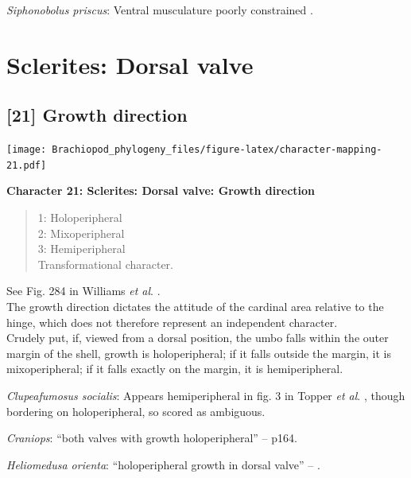 \documentclass[openany]{book}
\theoremstyle{definition}
\theoremstyle{definition}
\theoremstyle{definition}
\theoremstyle{remark}
\begin{document}
\hypertarget{Siphonobolus_priscus-coding-20}{}
\emph{Siphonobolus priscus}: Ventral musculature poorly constrained
\citep{Williams2000LinguliformeaCraniiformea, Popov2009Earlyontogeny}.

\section{Sclerites: Dorsal valve}\label{sclerites-dorsal-valve}

\subsection*{{[}21{]} Growth direction}\label{growth-direction}

\texttt{[image: Brachiopod\_phylogeny\_files/figure-latex/character-mapping-21.pdf]}

\textbf{Character 21: Sclerites: Dorsal valve: Growth direction}

\begin{quote}
1: Holoperipheral\\
2: Mixoperipheral\\
3: Hemiperipheral\\
Transformational character.
\end{quote}

See Fig. 284 in Williams \emph{et al}.
\citeyearpar{Williams1997Introduction}.\\
The growth direction dictates the attitude of the cardinal area relative
to the hinge, which does not therefore represent an independent
character.\\
Crudely put, if, viewed from a dorsal position, the umbo falls within
the outer margin of the shell, growth is holoperipheral; if it falls
outside the margin, it is mixoperipheral; if it falls exactly on the
margin, it is hemiperipheral.

\hypertarget{Clupeafumosus_socialis-coding-21}{}
\emph{Clupeafumosus socialis}: Appears hemiperipheral in fig. 3 in
Topper \emph{et al}. \citeyearpar{Topper2013Reappraisalof}, though
bordering on holoperipheral, so scored as ambiguous.

\hypertarget{Craniops-coding-21}{}
\emph{Craniops}: ``both valves with growth holoperipheral'' --
\citet{Williams2000LinguliformeaCraniiformea} p164.

\hypertarget{Heliomedusa_orienta-coding-21}{}
\emph{Heliomedusa orienta}: ``holoperipheral growth in dorsal valve'' --
\citet{Williams2007Supplement}.
\end{document}
